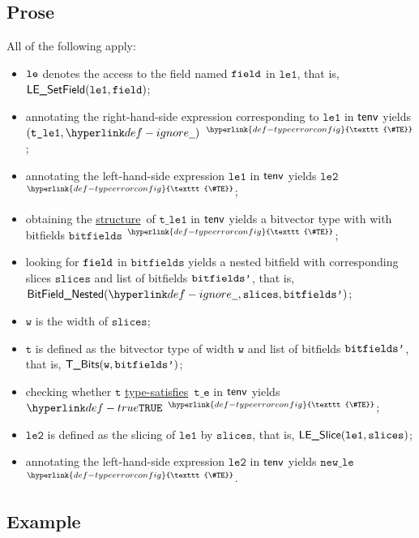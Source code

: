 \documentclass{book}
\newcommand\TypeErrorConfig[0]{\hyperlink{def-typeerrorconfig}{\texttt{\#TE}}}
\newcommand\ProseOrTypeError[0]{\hyperlink{def-proseortypeerror}{$^{\TypeErrorConfig}$}}
\newcommand\structure[0]{\hyperlink{def-structure}{structure}}
\newcommand\typesatisfies[0]{\hyperlink{def-typesatisfies}{type-satisfies}}
\newcommand\vt[0]{\texttt{t}}
\newcommand\vte[0]{\texttt{t\_e}}
\newcommand\vleone[0]{\texttt{le1}}
\newcommand\vletwo[0]{\texttt{le2}}
\newcommand\vtleone[0]{\texttt{t\_le1}}
\newcommand\vw[0]{\texttt{w}}
\newcommand\bitfields[0]{\texttt{bitfields}}
\newcommand\newle[0]{\texttt{new\_le}}
\newcommand\slices[0]{\texttt{slices}}
\begin{document}
\subsection{Prose}
All of the following apply:
\begin{itemize}
\item $\texttt{le}$ denotes the access to the field named $\texttt{field}$ in $\vleone$, that is, \\ $\LESetField(\vleone, \field)$;
\item annotating the right-hand-side expression corresponding to $\vleone$ in $\textsf{tenv}$ yields \\ $(\vtleone, \Ignore)$ \ProseOrTypeError;
\item annotating the left-hand-side expression $\vleone$ in $\textsf{tenv}$ yields $\vletwo$ \ProseOrTypeError;
\item obtaining the \structure\ of $\vtleone$ in $\textsf{tenv}$ yields a bitvector type with with bitfields $\bitfields$ \ProseOrTypeError;
\item looking for $\texttt{field}$ in $\bitfields$ yields a nested bitfield with corresponding slices $\slices$ and list of bitfields
      $\texttt{bitfields'}$, that is, \\ $\BitFieldNested(\Ignore, \slices, \bitfieldsp)$;
\item $\vw$ is the width of $\slices$;
\item $\vt$ is defined as the bitvector type of width $\vw$ and list of bitfields $\texttt{bitfields'}$, that is, $\TBits(\vw, \bitfieldsp)$;
\item checking whether $\vt$ \typesatisfies\ $\vte$ in $\textsf{tenv}$ yields $\True$ \ProseOrTypeError;
\item $\vletwo$ is defined as the slicing of $\vleone$ by $\slices$, that is, $\LESlice(\vleone, \slices)$;
\item annotating the left-hand-side expression $\vletwo$ in $\textsf{tenv}$ yields $\newle$ \ProseOrTypeError.
\end{itemize}

\subsection{Example}

\end{document}
